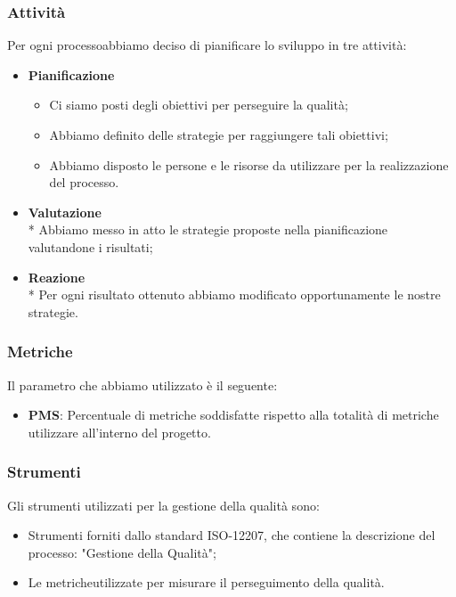 \subsubsection{Attività}
Per ogni processo\glosp abbiamo deciso di pianificare lo sviluppo in tre attività:
\begin{itemize}
	\item \textbf{Pianificazione}
		\begin{itemize}
			\item Ci siamo posti degli obiettivi per perseguire la qualità;
			\item Abbiamo definito delle strategie per raggiungere tali obiettivi;
			\item Abbiamo disposto le persone e le risorse da utilizzare per la realizzazione del processo\glo.
		\end{itemize}
	\item \textbf{Valutazione} \\*
		Abbiamo messo in atto le strategie proposte nella pianificazione valutandone i risultati;
	\item \textbf{Reazione} \\*
		Per ogni risultato ottenuto abbiamo modificato opportunamente le nostre strategie.
\end{itemize}
\subsubsection{Metriche}
Il parametro che abbiamo utilizzato è il seguente:
	\begin{itemize}
		\item \textbf{PMS}: Percentuale di metriche soddisfatte rispetto alla totalità di metriche utilizzare all'interno del progetto.
	\end{itemize}
\subsubsection{Strumenti}
Gli strumenti utilizzati per la gestione della qualità sono:
\begin{itemize}
	\item Strumenti forniti dallo standard ISO-12207, che contiene la descrizione del processo\glo: "Gestione della Qualità";
	\item Le metriche\glosp utilizzate per misurare il perseguimento della qualità.
\end{itemize}

